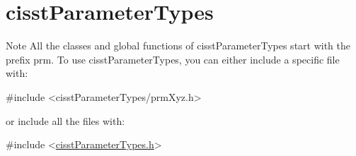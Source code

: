 \hypertarget{group__cisst_parameter_types}{\section{cisst\-Parameter\-Types}
\label{group__cisst_parameter_types}
}
\begin{DoxyNote}{Note}
All the classes and global functions of cisst\-Parameter\-Types start with the prefix prm. To use cisst\-Parameter\-Types, you can either include a specific file with\-: 
\begin{DoxyCode}
\textcolor{preprocessor}{#include <cisstParameterTypes/prmXyz.h>}
\end{DoxyCode}
 or include all the files with\-: 
\begin{DoxyCode}
\textcolor{preprocessor}{#include <\hyperlink{cisst_parameter_types_8h}{cisstParameterTypes.h}>}
\end{DoxyCode}
 
\end{DoxyNote}
